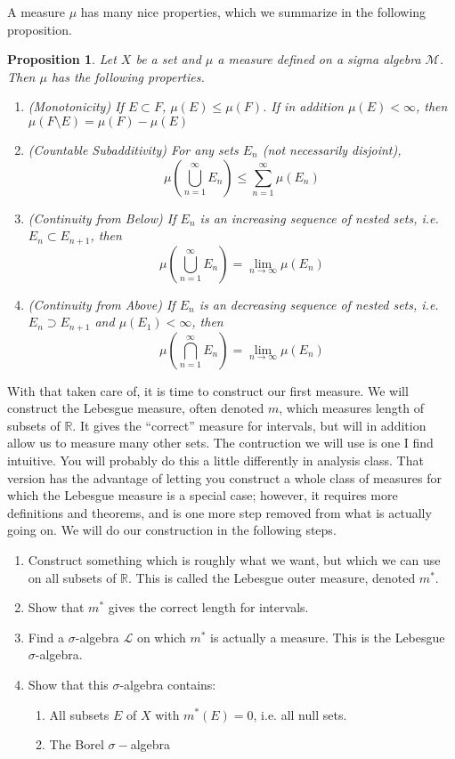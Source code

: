 \documentclass[10pt]{article}         %
\newtheorem{proposition}{Proposition}[section]
\theoremstyle{remark}
\newcommand{\R}{\mathbb{R}}
\begin{document}
A measure $\mu$ has many nice properties, which we summarize in the following proposition.

\begin{proposition}
Let $X$ be a set and $\mu$ a measure defined on a sigma algebra $\mathcal{M}$. Then $\mu$ has the following properties.
\begin{enumerate}
    \item (Monotonicity) If $E \subset F$, $\mu(E) \leq \mu(F)$. If in addition $\mu(E) < \infty$, then $\mu(F\setminus E) = \mu(F) - \mu(E)$
    \item (Countable Subadditivity) For any sets $E_n$ (not necessarily disjoint), 
    \[
    \mu\left( \bigcup_{n=1}^\infty E_n \right) \leq \sum_{n=1}^\infty \mu(E_n)
    \]
    \item (Continuity from Below) If $E_n$ is an increasing sequence of nested sets, i.e. $E_n \subset E_{n+1}$, then
    \[
    \mu\left( \bigcup_{n=1}^\infty E_n \right) = \lim_{n\rightarrow\infty} \mu(E_n)
    \]
    \item (Continuity from Above) If $E_n$ is an decreasing sequence of nested sets, i.e. $E_n \supset E_{n+1}$ and $\mu(E_1) < \infty$, then
    \[
    \mu\left( \bigcap_{n=1}^\infty E_n \right) = \lim_{n\rightarrow\infty} \mu(E_n)
    \]
\end{enumerate}
\end{proposition}

With that taken care of, it is time to construct our first measure. We will construct the Lebesgue measure, often denoted $m$, which measures length of subsets of $\R$. It gives the ``correct'' measure for intervals, but will in addition allow us to measure many other sets. The contruction we will use is one I find intuitive. You will probably do this a little differently in analysis class. That version has the advantage of letting you construct a whole class of measures for which the Lebesgue measure is a special case; however, it requires more definitions and theorems, and is one more step removed from what is actually going on. We will do our construction in the following steps.

\begin{enumerate}
    \item Construct something which is roughly what we want, but which we can use on all subsets of $\R$. This is called the Lebesgue outer measure, denoted $m^*$. 
    \item Show that $m^*$ gives the correct length for intervals.
    \item Find a $\sigma$-algebra $\mathcal{L}$ on which $m^*$ is actually a measure. This is the Lebesgue $\sigma$-algebra.
    \item Show that this $\sigma$-algebra contains:
    \begin{enumerate}
        \item All subsets $E$ of $X$ with $m^*(E) = 0$, i.e. all null sets.
        \item The Borel $\sigma-$algebra
    \end{enumerate}
\end{enumerate}
\end{document}
